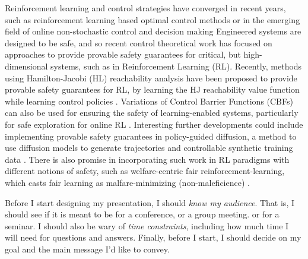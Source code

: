 \documentclass[10pt, oneside]{article}
\newenvironment{problem}[2][Problem]{\begin{trivlist}
    \item[\hskip \labelsep {\bfseries #1}\hskip \labelsep {\bfseries #2.}]}{\end{trivlist}}
\begin{document}
\begin{problem}{$\#4$}

    Reinforcement learning and control strategies have converged in recent years, such as reinforcement learning based optimal control methods \cite{shi2025reinforcement} or in the emerging field of online non-stochastic control and decision making \cite{yan2023online}
    Engineered systems are designed to be safe, and so recent control theoretical work has focused on approaches to provide provable safety guarantees for critical, but high-dimensional systems, such as in Reinforcement Learning (RL).  Recently, methods using Hamilton-Jacobi (HL) reachability analysis have been proposed to provide provable safety guarantees for RL, by learning the HJ reachability value function while learning control policies \cite{ganai2024hamilton}.  Variations of Control Barrier Functions (CBFs) can also be used for ensuring the safety of learning-enabled systems, particularly for safe exploration for online RL \cite{cohen2023safe}. Interesting further developments could include implementing provable safety guarantees in policy-guided diffusion, a method to use diffusion models to generate trajectories and controllable synthetic training data \cite{jackson2024policy}. There is also promise in incorporating such work in RL paradigms with different notions of safety, such as welfare-centric fair reinforcement-learning, which casts fair learning as malfare-minimizing (non-maleficience) \cite{cousins2022fair}. 




\end{problem}

\begin{problem}{$\#5$}
Before I start designing my presentation, I should \textit{know my audience}. That is, I should see if it is meant to be for a conference, or a group meeting. or for a seminar. I should also be wary of \textit{time constraints}, including how much time I will need for questions and answers. Finally, before I start, I should decide on my goal and the main message I'd like to convey. 
\end{problem}
\newpage


\end{document}
